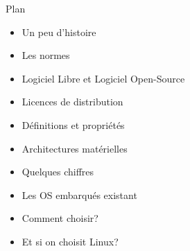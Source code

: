 \documentclass[12pt,t]{beamer}
\newcommand{\bi}{\begin{itemize}}
\newcommand{\ei}{\end{itemize}}
\begin{document}
\begin{frame}{Plan}
    \subt{}

    \bi
        \itemsep6pt
        \item Un peu d'histoire
        \item Les normes
        \item Logiciel Libre et Logiciel Open-Source
        \item Licences de distribution
        \item Définitions et propriétés
        \item Architectures matérielles
        \item Quelques chiffres
        \item Les OS embarqués existant
        \item Comment choisir?
        \item Et si on choisit Linux?
    \ei

    \note {
    }
\end{frame}
\end{document}
